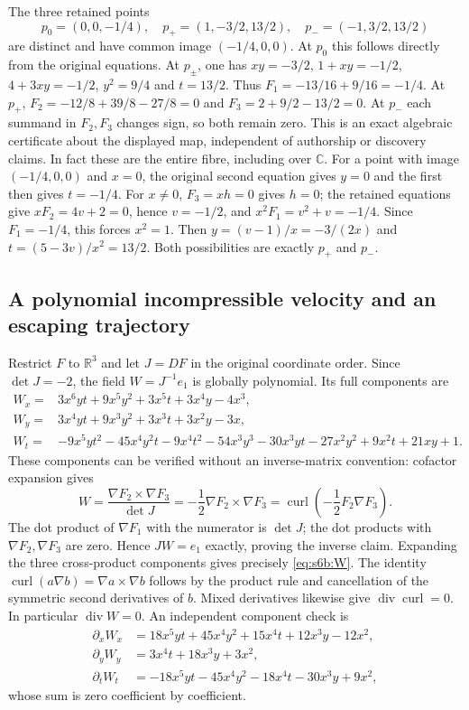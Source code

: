 The three retained points
\[
 p_0=(0,0,-1/4),\quad p_+=(1,-3/2,13/2),\quad
 p_-=(-1,3/2,13/2)
\]
are distinct and have common image $(-1/4,0,0)$.  At $p_0$ this follows
directly from the original equations.  At $p_\pm$, one has
$xy=-3/2$, $1+xy=-1/2$, $4+3xy=-1/2$, $y^2=9/4$ and $t=13/2$.
Thus $F_1=-13/16+9/16=-1/4$.  At $p_+$,
$F_2=-12/8+39/8-27/8=0$ and $F_3=2+9/2-13/2=0$.
At $p_-$ each summand in $F_2,F_3$ changes sign, so both remain zero.
This is an exact algebraic certificate about the displayed map, independent
of authorship or discovery claims.
In fact these are the entire fibre, including over $\mathbb C$.
For a point with image $(-1/4,0,0)$ and $x=0$, the original second equation
gives $y=0$ and the first then gives $t=-1/4$.
For $x\ne0$, $F_3=xh=0$ gives $h=0$; the retained equations give
$xF_2=4v+2=0$, hence $v=-1/2$, and
$x^2F_1=v^2+v=-1/4$.  Since $F_1=-1/4$, this forces $x^2=1$.
Then $y=(v-1)/x=-3/(2x)$ and
$t=(5-3v)/x^2=13/2$.  Both possibilities are exactly $p_+$ and $p_-$.

\subsection{A polynomial incompressible velocity and an escaping trajectory}
Restrict $F$ to $\mathbb R^3$ and let $J=DF$ in the original coordinate order.
Since $\det J=-2$, the field $W=J^{-1}e_1$ is globally polynomial.  Its full
components are
\begin{align}
 W_x={}&3x^6yt+9x^5y^2+3x^5t+3x^4y-4x^3,\\
 W_y={}&3x^4yt+9x^3y^2+3x^3t+3x^2y-3x,\\
 W_t={}&-9x^5yt^2-45x^4y^2t-9x^4t^2-54x^3y^3
          -30x^3yt-27x^2y^2+9x^2t+21xy+1.
 \label{eq:s6b:W}
\end{align}
These components can be verified without an inverse-matrix convention:
cofactor expansion gives
\begin{equation}
 W=\frac{\nabla F_2\times\nabla F_3}{\det J}
   =-\frac12\nabla F_2\times\nabla F_3
   =\operatorname{curl}\!\left(-\frac12 F_2\nabla F_3\right).
 \label{eq:s6b:potential}
\end{equation}
The dot product of $\nabla F_1$ with the numerator is $\det J$; the dot
products with $\nabla F_2,\nabla F_3$ are zero.  Hence $JW=e_1$ exactly,
proving the inverse claim.  Expanding the three cross-product components
gives precisely \eqref{eq:s6b:W}.  The identity
$\operatorname{curl}(a\nabla b)=\nabla a\times\nabla b$ follows by
the product rule and cancellation of the symmetric second derivatives of
$b$.  Mixed derivatives likewise give $\operatorname{div}\operatorname{curl}=0$.
In particular $\operatorname{div}W=0$.  An independent component check is
\begin{align*}
 \partial_xW_x&=18x^5yt+45x^4y^2+15x^4t+12x^3y-12x^2,\\
 \partial_yW_y&=3x^4t+18x^3y+3x^2,\\
 \partial_tW_t&=-18x^5yt-45x^4y^2-18x^4t-30x^3y+9x^2,
\end{align*}
whose sum is zero coefficient by coefficient.

